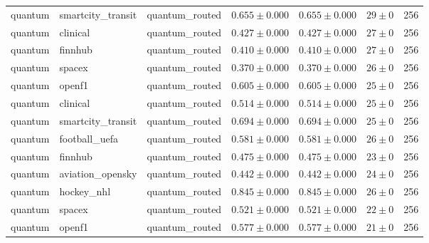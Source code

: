 \begin{table}[htbp]
\begin{tabular}{l l l r r r r}
quantum & smartcity\_transit & quantum\_routed & $0.655\pm0.000$ & $0.655\pm0.000$ & $29\pm0$ & 256 \\
quantum & clinical & quantum\_routed & $0.427\pm0.000$ & $0.427\pm0.000$ & $27\pm0$ & 256 \\
quantum & finnhub & quantum\_routed & $0.410\pm0.000$ & $0.410\pm0.000$ & $27\pm0$ & 256 \\
quantum & spacex & quantum\_routed & $0.370\pm0.000$ & $0.370\pm0.000$ & $26\pm0$ & 256 \\
quantum & openf1 & quantum\_routed & $0.605\pm0.000$ & $0.605\pm0.000$ & $25\pm0$ & 256 \\
quantum & clinical & quantum\_routed & $0.514\pm0.000$ & $0.514\pm0.000$ & $25\pm0$ & 256 \\
quantum & smartcity\_transit & quantum\_routed & $0.694\pm0.000$ & $0.694\pm0.000$ & $25\pm0$ & 256 \\
quantum & football\_uefa & quantum\_routed & $0.581\pm0.000$ & $0.581\pm0.000$ & $26\pm0$ & 256 \\
quantum & finnhub & quantum\_routed & $0.475\pm0.000$ & $0.475\pm0.000$ & $23\pm0$ & 256 \\
quantum & aviation\_opensky & quantum\_routed & $0.442\pm0.000$ & $0.442\pm0.000$ & $24\pm0$ & 256 \\
quantum & hockey\_nhl & quantum\_routed & $0.845\pm0.000$ & $0.845\pm0.000$ & $26\pm0$ & 256 \\
quantum & spacex & quantum\_routed & $0.521\pm0.000$ & $0.521\pm0.000$ & $22\pm0$ & 256 \\
quantum & openf1 & quantum\_routed & $0.577\pm0.000$ & $0.577\pm0.000$ & $21\pm0$ & 256 \\
\hline
\end{tabular}
\end{table}
